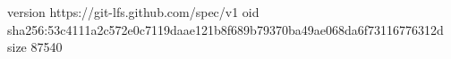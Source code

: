 version https://git-lfs.github.com/spec/v1
oid sha256:53c4111a2c572e0c7119daae121b8f689b79370ba49ae068da6f73116776312d
size 87540
